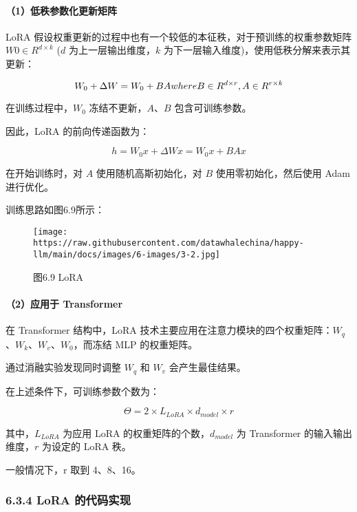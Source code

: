 \documentclass[12pt,a4paper]{book}
\begin{document}
\paragraph{（1）低秩参数化更新矩阵}\label{ux4f4eux79e9ux53c2ux6570ux5316ux66f4ux65b0ux77e9ux9635}

LoRA 假设权重更新的过程中也有一个较低的本征秩，对于预训练的权重参数矩阵
\(W0 \in R^{d \times k}\) (\(d\) 为上一层输出维度，\(k\)
为下一层输入维度)，使用低秩分解来表示其更新：

\[W_0 + {\Delta}W = W_0 + BA \space\space  where \space B \in R^{d \times r}, A \in R^{r \times k}\]

在训练过程中，\(W_0\) 冻结不更新，\(A\)、\(B\) 包含可训练参数。

因此，LoRA 的前向传递函数为：

\[h = W_0 x + \Delta W x = W_0 x + B A x\]

在开始训练时，对 \(A\) 使用随机高斯初始化，对 \(B\)
使用零初始化，然后使用 Adam 进行优化。

训练思路如图6.9所示：

\begin{figure}[htbp]\centering
\texttt{[image: https://raw.githubusercontent.com/datawhalechina/happy-llm/main/docs/images/6-images/3-2.jpg]}
\caption{图6.9 LoRA}
\end{figure}

\paragraph{（2）应用于
Transformer}\label{ux5e94ux7528ux4e8e-transformer}

在 Transformer 结构中，LoRA
技术主要应用在注意力模块的四个权重矩阵：\(W_q\)、\(W_k\)、\(W_v\)、\(W_0\)，而冻结
MLP 的权重矩阵。

通过消融实验发现同时调整 \(W_q\) 和 \(W_v\) 会产生最佳结果。

在上述条件下，可训练参数个数为：

\[\Theta = 2 \times L_{LoRA} \times d_{model} \times r\]

其中，\(L_{LoRA}\) 为应用 LoRA 的权重矩阵的个数，\(d_{model}\) 为
Transformer 的输入输出维度，\(r\) 为设定的 LoRA 秩。

一般情况下，r 取到 4、8、16。

\subsubsection{6.3.4 LoRA
的代码实现}\label{lora-ux7684ux4ee3ux7801ux5b9eux73b0}
\end{document}
